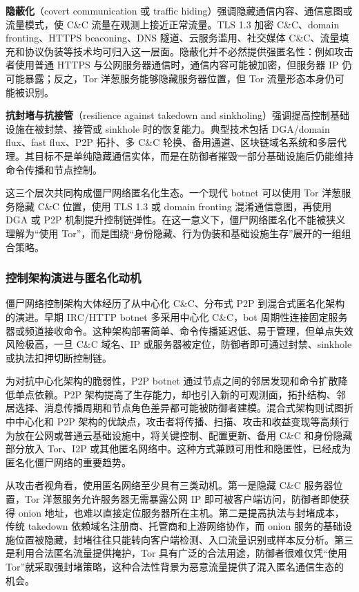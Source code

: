 \textbf{隐蔽化}（covert communication 或 traffic hiding）强调隐藏通信内容、通信意图或流量模式，使 C\&C 流量在观测上接近正常流量。TLS 1.3 加密 C\&C、domain fronting、HTTPS beaconing、DNS 隧道、云服务滥用、社交媒体 C\&C、流量填充和协议伪装等技术均可归入这一层面。隐蔽化并不必然提供强匿名性：例如攻击者使用普通 HTTPS 与公网服务器通信时，通信内容可能被加密，但服务器 IP 仍可能暴露；反之，Tor 洋葱服务能够隐藏服务器位置，但 Tor 流量形态本身仍可能被识别。

\textbf{抗封堵与抗接管}（resilience against takedown and sinkholing）强调提高控制基础设施在被封禁、接管或 sinkhole 时的恢复能力。典型技术包括 DGA/domain flux、fast flux、P2P 拓扑、多 C\&C 轮换、备用通道、区块链域名系统和多层代理。其目标不是单纯隐藏通信实体，而是在防御者摧毁一部分基础设施后仍能维持命令传播和节点控制。

这三个层次共同构成僵尸网络匿名化生态。一个现代 botnet 可以使用 Tor 洋葱服务隐藏 C\&C 位置，使用 TLS 1.3 或 domain fronting 混淆通信意图，再使用 DGA 或 P2P 机制提升控制链弹性。在这一意义下，僵尸网络匿名化不能被狭义理解为“使用 Tor”，而是围绕“身份隐藏、行为伪装和基础设施生存”展开的一组组合策略。

\subsubsection{控制架构演进与匿名化动机}
\label{subsec:botnet_architecture}

僵尸网络控制架构大体经历了从中心化 C\&C、分布式 P2P 到混合式匿名化架构的演进。早期 IRC/HTTP botnet 多采用中心化 C\&C，bot 周期性连接固定服务器或频道接收命令。这种架构部署简单、命令传播延迟低、易于管理，但单点失效风险极高，一旦 C\&C 域名、IP 或服务器被定位，防御者即可通过封禁、sinkhole 或执法扣押切断控制链。

为对抗中心化架构的脆弱性，P2P botnet 通过节点之间的邻居发现和命令扩散降低单点依赖。P2P 架构提高了生存能力，却也引入新的可观测面，拓扑结构、邻居选择、消息传播周期和节点角色差异都可能被防御者建模。混合式架构则试图折中中心化和 P2P 架构的优缺点，攻击者将传播、扫描、攻击和收益变现等高频行为放在公网或普通云基础设施中，将关键控制、配置更新、备用 C\&C 和身份隐藏部分放入 Tor、I2P 或其他匿名网络中。这种方式兼顾可用性和隐匿性，已经成为匿名化僵尸网络的重要趋势。

从攻击者视角看，使用匿名网络至少具有三类动机。第一是隐藏 C\&C 服务器位置，Tor 洋葱服务允许服务器无需暴露公网 IP 即可被客户端访问，防御者即使获得 onion 地址，也难以直接定位服务器所在主机。第二是提高执法与封堵成本，传统 takedown 依赖域名注册商、托管商和上游网络协作，而 onion 服务的基础设施位置被隐藏，封堵往往只能转向客户端检测、入口流量识别或样本反分析。第三是利用合法匿名流量提供掩护，Tor 具有广泛的合法用途，防御者很难仅凭“使用 Tor”就采取强封堵策略，这种合法性背景为恶意流量提供了混入匿名通信生态的机会。

